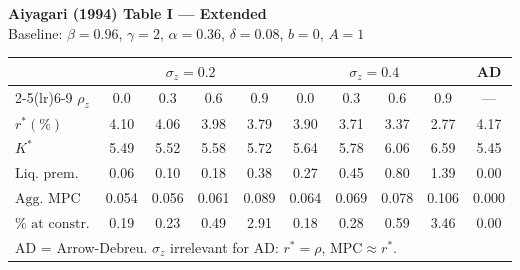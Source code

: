 \begin{center}
{\small \textbf{Aiyagari (1994) Table I --- Extended}\\[3pt]
Baseline: $\beta=0.96$, $\gamma=2$, $\alpha=0.36$, $\delta=0.08$, $b=0$, $A=1$}\\[6pt]
\begin{tabular}{lcccc|cccc|c}
\toprule
& \multicolumn{4}{c|}{$\sigma_z = 0.2$}
& \multicolumn{4}{c|}{$\sigma_z = 0.4$}
& AD \\
\cmidrule(lr){2-5}\cmidrule(lr){6-9}
$\rho_z$ & 0.0 & 0.3 & 0.6 & 0.9 & 0.0 & 0.3 & 0.6 & 0.9 & --- \\
\midrule
$r^* (\%)$ & 4.10 & 4.06 & 3.98 & 3.79 & 3.90 & 3.71 & 3.37 & 2.77 & 4.17 \\
$K^*$ & 5.49 & 5.52 & 5.58 & 5.72 & 5.64 & 5.78 & 6.06 & 6.59 & 5.45 \\
$\text{Liq. prem. (pp)}$ & 0.06 & 0.10 & 0.18 & 0.38 & 0.27 & 0.45 & 0.80 & 1.39 & 0.00 \\
$\text{Agg. MPC}$ & 0.054 & 0.056 & 0.061 & 0.089 & 0.064 & 0.069 & 0.078 & 0.106 & 0.000 \\
$\% \text{ at constr.}$ & 0.19 & 0.23 & 0.49 & 2.91 & 0.18 & 0.28 & 0.59 & 3.46 & 0.00 \\
\bottomrule
\multicolumn{10}{l}{\footnotesize AD = Arrow-Debreu. $\sigma_z$ irrelevant for AD: $r^*=\rho$, MPC$\approx r^*$.}
\end{tabular}
\end{center}
